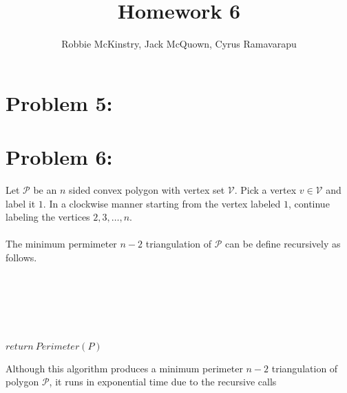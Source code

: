 \documentclass[12pt]{article}
\begin{document}
\title{Homework 6}
\author{Robbie McKinstry, Jack McQuown, Cyrus Ramavarapu}
\renewcommand{\today}{15 September 2016}
\renewcommand{\baselinestretch}{1.5}
\maketitle

\section*{Problem 5: }
\section*{Problem 6: }
Let $\mathcal{P}$ be an $n$ sided convex polygon with vertex set
$\mathcal{V}$.  Pick a vertex $v\in\mathcal{V}$ and label it $1$.
In a clockwise manner starting from the vertex labeled $1$, continue
labeling the vertices $2,3,\dots,n$.\\\\
The minimum permimeter $n-2$ triangulation of $\mathcal{P}$ can be
define recursively as follows.\\\\
\begin{algorithm}[H]
\\
\\
\\
\\
{$return\ Perimeter(P)$}
\end{algorithm}
Although this algorithm produces a minimum perimeter $n-2$ triangulation of
polygon $\mathcal{P}$, it runs in exponential time due to the recursive calls
\end{document}
